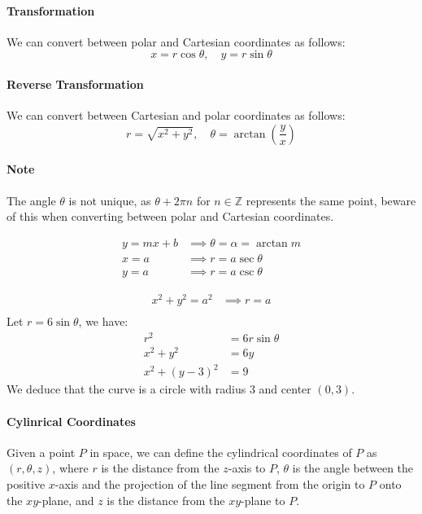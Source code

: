 \documentclass[11pt]{article}
\begin{document}
\paragraph{Transformation} We can convert between polar and Cartesian coordinates as follows:
\begin{equation}
    x = r\cos \theta, \quad y = r\sin \theta
\end{equation}
\paragraph{Reverse Transformation} We can convert between Cartesian and polar coordinates as follows:
\begin{equation}
    r = \sqrt{x^2 + y^2}, \quad \theta = \arctan\left(\frac{y}{x}\right)
\end{equation}
\paragraph{Note} The angle $\theta$ is not unique, as $\theta + 2\pi n$ for $n \in \mathbb{Z}$ represents the same point, beware of this when converting between polar and Cartesian coordinates.
\begin{example}[Lines]
    \begin{align*}
        y = mx + b &\implies \theta = \alpha = \arctan m \\
        x = a &\implies r = a\sec \theta \\
        y = a &\implies r = a\csc \theta
    \end{align*}
\end{example}
\begin{example}[Cirlces]
    \begin{align*}
        x^2 + y^2 = a^2 &\implies r = a \\
    \end{align*}
    Let $r = 6\sin \theta$, we have:
    \begin{align*}
        r^2 &= 6r\sin \theta \\
        x^2 + y^2 &= 6y \\
        x^2 + (y-3)^2 &= 9
    \end{align*}
    We deduce that the curve is a circle with radius $3$ and center $(0,3)$.
\end{example}
\paragraph{Cylinrical Coordinates} Given a point $P$ in space, we can define the cylindrical coordinates of $P$ as $(r, \theta, z)$, where $r$ is the distance from the $z$-axis to $P$, $\theta$ is the angle between the positive $x$-axis and the projection of the line segment from the origin to $P$ onto the $xy$-plane, and $z$ is the distance from the $xy$-plane to $P$.
\end{document}
